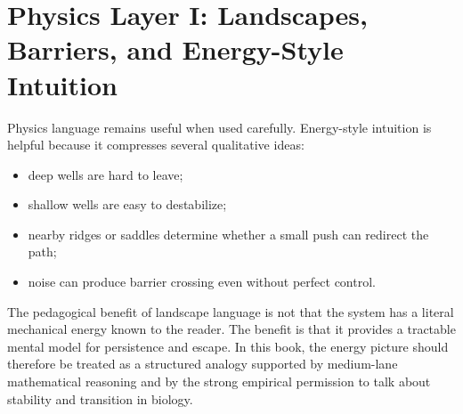 \section{Physics Layer I: Landscapes, Barriers, and Energy-Style Intuition}

Physics language remains useful when used carefully. Energy-style intuition is
helpful because it compresses several qualitative ideas:
\begin{itemize}[nosep]
  \item deep wells are hard to leave;
  \item shallow wells are easy to destabilize;
  \item nearby ridges or saddles determine whether a small push can redirect
        the path;
  \item noise can produce barrier crossing even without perfect control.
\end{itemize}

\begin{discussion}
The pedagogical benefit of landscape language is not that the system has a
literal mechanical energy known to the reader. The benefit is that it provides
a tractable mental model for persistence and escape. In this book, the energy
picture should therefore be treated as a structured analogy supported by
medium-lane mathematical reasoning and by the strong empirical permission to
talk about stability and transition in biology.
\end{discussion}
